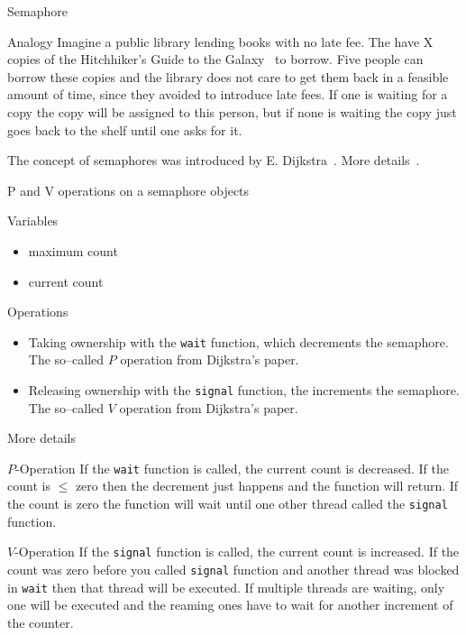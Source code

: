 \documentclass[\classoption]{beamer}
\begin{document}
\begin{frame}{Semaphore}

\begin{block}{Analogy}
Imagine a public library lending books with no late fee. The have X copies of the Hitchhiker's Guide to the Galaxy~\cite{adams2017hitchhiker} to borrow. Five people can borrow these copies and the library does not care to get them back in a feasible amount of time, since they avoided to introduce late fees. If one is waiting for a copy the copy will be assigned to this person, but if none is waiting the copy just goes back to the shelf until one asks for it. 
\end{block}
\vspace{0.5cm}
The concept of semaphores was introduced by E. Dijkstra~\cite{dijkstra1962over}. More details~\cite{downey2008little}.
\end{frame}

\begin{frame}{P and V operations on a semaphore objects}

\begin{block}{Variables}
\begin{itemize}
\item maximum count
\item current count
\end{itemize}
\end{block}

\begin{block}{Operations}
\begin{itemize}
\item Taking ownership with the \lstinline|wait| function, which decrements the semaphore. The so--called $P$ operation from Dijkstra's paper.
\item Releasing ownership with the \lstinline|signal| function, the increments the semaphore. The so--called $V$ operation from Dijkstra's paper.
\end{itemize}
\end{block}

\end{frame}

\begin{frame}{More details}

\begin{block}{$P$-Operation}
If the \lstinline|wait| function is called, the current count is decreased. If the count is $\leq$ zero then the decrement just happens and the function will return. If the count is zero the function will wait until one other thread called the  \lstinline|signal| function.
\end{block}

\begin{block}{$V$-Operation}
If the \lstinline|signal| function is called, the current count is increased. If the count was zero before you called \lstinline|signal| function and another thread was blocked in \lstinline|wait| then that thread will be executed. If multiple threads are waiting, only one will be executed and the reaming ones have to wait for another increment of the counter.
\end{block}

\end{frame}
\end{document}
